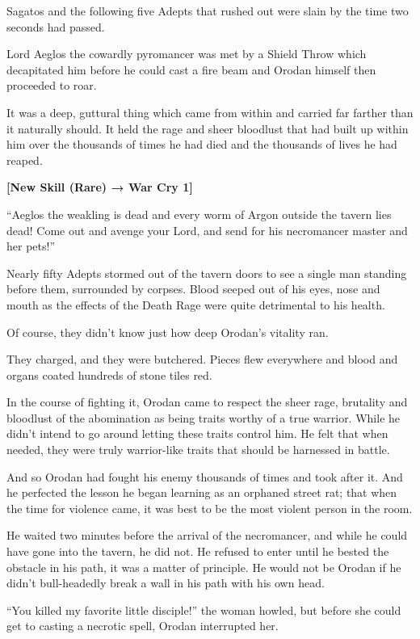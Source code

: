 \documentclass[a4paper,10pt]{book}
\begin{document}
Sagatos and the following five Adepts that rushed out were slain by the time two seconds had passed.\par
Lord Aeglos the cowardly pyromancer was met by a Shield Throw which decapitated him before he could cast a fire beam and Orodan himself then proceeded to roar.\par
It was a deep, guttural thing which came from within and carried far farther than it naturally should. It held the rage and sheer bloodlust that had built up within him over the thousands of times he had died and the thousands of lives he had reaped.\par
\textbf{[New Skill (Rare) → War Cry 1]}\par
“Aeglos the weakling is dead and every worm of Argon outside the tavern lies dead! Come out and avenge your Lord, and send for his necromancer master and her pets!”\par
Nearly fifty Adepts stormed out of the tavern doors to see a single man standing before them, surrounded by corpses. Blood seeped out of his eyes, nose and mouth as the effects of the Death Rage were quite detrimental to his health.\par
Of course, they didn’t know just how deep Orodan’s vitality ran.\par
They charged, and they were butchered. Pieces flew everywhere and blood and organs coated hundreds of stone tiles red.\par
In the course of fighting it, Orodan came to respect the sheer rage, brutality and bloodlust of the abomination as being traits worthy of a true warrior. While he didn’t intend to go around letting these traits control him. He felt that when needed, they were truly warrior-like traits that should be harnessed in battle.\par
And so Orodan had fought his enemy thousands of times and took after it. And he perfected the lesson he began learning as an orphaned street rat; that when the time for violence came, it was best to be the most violent person in the room.\par
He waited two minutes before the arrival of the necromancer, and while he could have gone into the tavern, he did not. He refused to enter until he bested the obstacle in his path, it was a matter of principle. He would not be Orodan if he didn’t bull-headedly break a wall in his path with his own head.\par
“You killed my favorite little disciple!” the woman howled, but before she could get to casting a necrotic spell, Orodan interrupted her.\par
\end{document}
